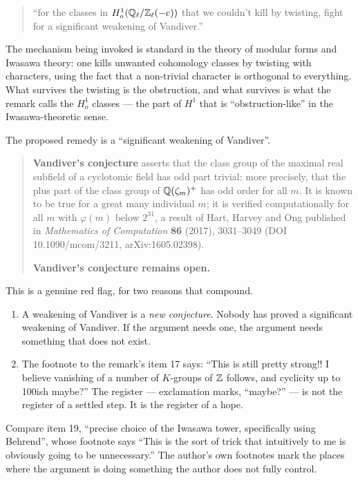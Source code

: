 \begin{quote}
\small
``for the classes in $H^1_o\idx{H\textsuperscript{1}o classes}(\QQ_\ell/\ZZ_\ell(-e))$ that we couldn't kill by
twisting, fight for a significant weakening of Vandiver.''
\end{quote}

The mechanism being invoked is standard in the theory of modular forms and
Iwasawa theory: one kills unwanted cohomology classes by twisting with
characters, using the fact that a non-trivial character is orthogonal to
everything. What survives the twisting is the obstruction, and what survives is
what the remark calls the $H^1_o$ classes --- the part of $H^1$ that is
``obstruction-like'' in the Iwasawa-theoretic sense.

The proposed remedy is a ``significant weakening of Vandiver''.

\begin{quote}
\textbf{Vandiver's conjecture} asserts that the class group of the maximal real
subfield of a cyclotomic field has odd part trivial: more precisely, that the
plus part of the class group of $\mathbb{Q}(\zeta_m)^+$ has odd order for all $m$.
It is known to be true for a great many individual $m$; it is verified
computationally for all $m$ with $\varphi(m)$ below $2^{31}$, a result of Hart,
Harvey and Ong published in \emph{Mathematics of Computation} \textbf{86}
(2017), 3031--3049 (DOI 10.1090/mcom/3211, arXiv:1605.02398).

\textbf{Vandiver's conjecture remains open.}
\end{quote}

This is a genuine red flag, for two reasons that compound.

\begin{enumerate}
\item A weakening of Vandiver is a \emph{new conjecture}. Nobody has proved a
significant weakening of Vandiver. If the argument needs one, the argument
needs something that does not exist.
\item The footnote to the remark's item 17 says: ``This is still pretty strong!!
I believe vanishing of a number of $K$-groups of $\mathbb{Z}$ follows, and cyclicity
up to 100ish maybe?'' The register --- exclamation marks, ``maybe?'' --- is
not the register of a settled step. It is the register of a hope.
\end{enumerate}

Compare item 19, ``precise choice of the Iwasawa tower, specifically using
Behrend'', whose footnote says ``This is the sort of trick that intuitively to
me is obviously going to be unnecessary.'' The author's own footnotes mark the
places where the argument is doing something the author does not fully
control.

